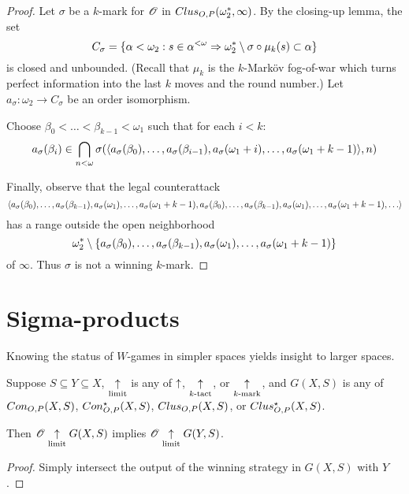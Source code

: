 \begin{proof}
  Let $\sigma$ be a $k$-mark for $\mathscr{O}$ in
  $Clus_{O,P}(\omega^*_2,\infty)$. By the closing-up lemma, the set
    \[
      C_\sigma
        =
      \{
        \alpha<\omega_2
          :
        s\in\alpha^{<\omega}
          \Rightarrow
        \omega^*_2\setminus\sigma\circ\mu_k(s)
        \subset \alpha
      \}
    \]
  is closed and unbounded. (Recall that $\mu_k$ is the
  $k$-Mark\"ov fog-of-war which turns perfect information into the last $k$
  moves and the round number.) Let $a_\sigma:\omega_2\to C_\sigma$ be
  an order isomorphism.

  Choose $\beta_0<\dots<\beta_{k-1}<\omega_1$ such that for each $i<k$:
    \[
      a_\sigma(\beta_i)
        \in
      \bigcap_{n<\omega}
      \sigma(
        \langle a_\sigma(\beta_0),\dots,a_\sigma(\beta_{i-1}),
          a_\sigma(\omega_1+i),\dots,a_\sigma(\omega_1+k-1)\rangle,
      n)
    \]

  Finally, observe that the legal counterattack
    \[
      \<a_\sigma(\beta_0),\dots,a_\sigma(\beta_{k-1}),
        a_\sigma(\omega_1),\dots,a_\sigma(\omega_1+k-1),
        a_\sigma(\beta_0),\dots,a_\sigma(\beta_{k-1}),
        a_\sigma(\omega_1),\dots,a_\sigma(\omega_1+k-1),
        \dots\>
    \]
  has a range outside the open neighborhood %
    \[
      \omega^*_2
        \setminus
      \{a_\sigma(\beta_0),\dots,a_\sigma(\beta_{k-1}),
        a_\sigma(\omega_1),\dots,a_\sigma(\omega_1+k-1)\}
    \]
  of $\infty$. Thus $\sigma$ is not a winning $k$-mark.
\end{proof}



\section{Sigma-products}

Knowing the status of $W$-games in simpler spaces yields insight to larger
spaces.

\begin{prop}
  Suppose $S\subseteq Y\subseteq X$, $\underset{\text{limit}}{\uparrow}$ is any of $\uparrow$,
  $\underset{k\text{-tact}}{\uparrow}$, or $\underset{k\text{-mark}}{\uparrow}$, and $G(X,S)$ is any of $Con_{O,P}(X,S)$,
  $Con_{O,P}^\star(X,S)$, $Clus_{O,P}(X,S)$, or $Clus_{O,P}^\star(X,S)$.

  Then $\mathscr{O} \underset{\text{limit}}{\uparrow} G(X,S)$ implies $\mathscr{O} \underset{\text{limit}}{\uparrow} G(Y,S)$.
\end{prop}

\begin{proof}
  Simply intersect the output of the winning strategy in $G(X,S)$ with $Y$.
\end{proof}

